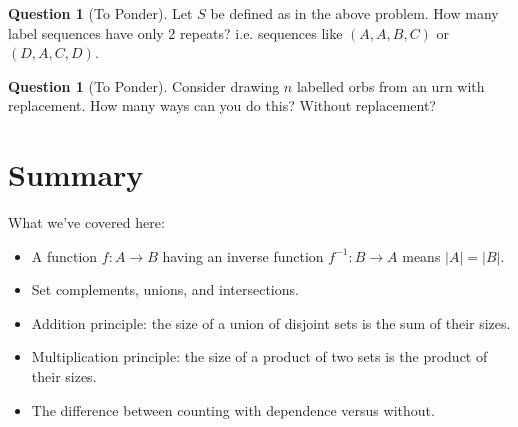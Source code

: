 \documentclass[openany]{book}
\theoremstyle{definition}
\newtheorem{question}[thm]{Question}
\begin{document}
    \begin{question}[To Ponder]\hfill
    
        Let $S$ be defined as in the above problem. How many label sequences have only 2 repeats? i.e. sequences like $(A,A,B,C)$ or $(D,A,C,D)$.
    \end{question}
    \begin{question}[To Ponder]\hfill
    
        Consider drawing $n$ labelled orbs from an urn with replacement. How many ways can you do this? Without replacement?
    \end{question}

\section{Summary}
What we've covered here:
    \begin{itemize}
        \item A function $f:A\to B$ having an inverse function $f^{-1}:B\to A$ means $|A|=|B|$.
        \item Set complements, unions, and intersections. 
        \item Addition principle: the size of a union of disjoint sets is the sum of their sizes.
        \item Multiplication principle: the size of a product of two sets is the product of their sizes.
        \item The difference between counting with dependence versus without.
    \end{itemize}
\end{document}
